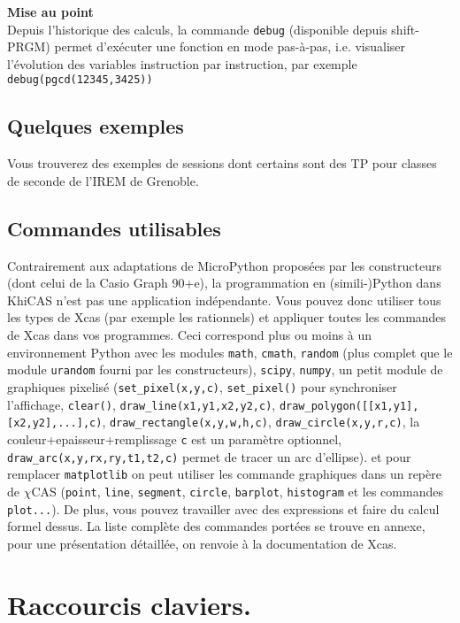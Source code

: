\documentclass{article}
\begin{document}
\begin{giacjshere}
{\bf Mise au point}\\
Depuis l'historique des calculs,
la commande \verb|debug| (disponible depuis shift-PRGM) permet 
d'ex\'ecuter une fonction en mode pas-\`a-pas, i.e.
visualiser l'\'evolution des variables instruction par instruction,
par exemple\\
\verb|debug(pgcd(12345,3425))|

\subsection{Quelques exemples}
Vous trouverez
 des exemples de sessions
dont certains sont des TP pour classes de seconde de l'IREM de Grenoble.

\subsection{Commandes utilisables}
Contrairement aux adaptations de MicroPython propos\'ees par
les constructeurs (dont
celui de la Casio Graph 90+e), la programmation en (simili-)Python 
dans KhiCAS n'est pas une application ind\'ependante. 
Vous pouvez donc utiliser tous les types
de Xcas (par exemple les rationnels) et appliquer toutes
les commandes de Xcas dans vos programmes. Ceci correspond
plus ou moins \`a un environnement Python avec les modules
\verb|math|, \verb|cmath|, \verb|random| (plus complet
que le module \verb|urandom| fourni par les constructeurs),
\verb|scipy|, \verb|numpy|, un petit module de graphiques
pixelis\'e 
(\verb|set_pixel(x,y,c)|, \verb|set_pixel()|
pour synchroniser l'affichage, \verb|clear()|,
\verb|draw_line(x1,y1,x2,y2,c)|, 
\verb|draw_polygon([[x1,y1],[x2,y2],...],c)|,
\verb|draw_rectangle(x,y,w,h,c)|, \verb|draw_circle(x,y,r,c)|,
la couleur+epaisseur+remplissage \verb|c| est un param\`etre optionnel,
\verb|draw_arc(x,y,rx,ry,t1,t2,c)| permet de tracer un arc
d'ellipse).
et pour remplacer \verb|matplotlib| on peut utiliser
les commande graphiques dans un rep\`ere de $\chi$CAS
(\verb|point|, \verb|line|, \verb|segment|, \verb|circle|,
\verb|barplot|, \verb|histogram| et les commandes \verb|plot...|).
De plus, vous pouvez travailler avec des expressions et faire
du calcul formel dessus.
La liste compl\`ete des commandes port\'ees se trouve en annexe,
pour une pr\'esentation d\'etaill\'ee, on renvoie \`a la documentation
de Xcas.

\section{Raccourcis claviers.} \label{sec:raccourcis}

\end{giacjshere}
\end{document}
